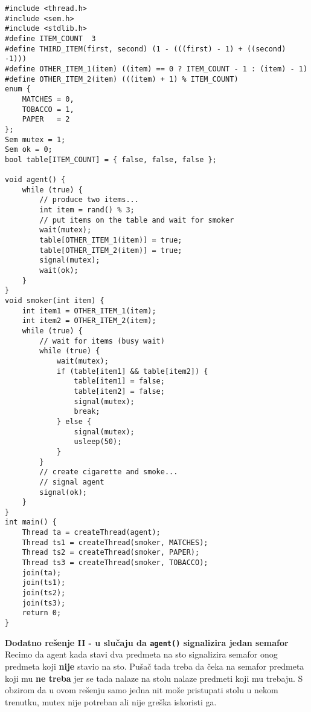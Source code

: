 \begin{lstlisting}
#include <thread.h>
#include <sem.h>
#include <stdlib.h>
#define ITEM_COUNT  3
#define THIRD_ITEM(first, second) (1 - (((first) - 1) + ((second) -1)))
#define OTHER_ITEM_1(item) ((item) == 0 ? ITEM_COUNT - 1 : (item) - 1)
#define OTHER_ITEM_2(item) (((item) + 1) % ITEM_COUNT) 
enum {
    MATCHES = 0,
    TOBACCO = 1,
    PAPER   = 2
};
Sem mutex = 1;
Sem ok = 0;
bool table[ITEM_COUNT] = { false, false, false };

void agent() {
    while (true) {
        // produce two items...
        int item = rand() % 3;
        // put items on the table and wait for smoker
        wait(mutex);
        table[OTHER_ITEM_1(item)] = true;
        table[OTHER_ITEM_2(item)] = true;
        signal(mutex);
        wait(ok);
    }
}
void smoker(int item) {
    int item1 = OTHER_ITEM_1(item);
    int item2 = OTHER_ITEM_2(item);
    while (true) {
        // wait for items (busy wait)
        while (true) {
            wait(mutex);
            if (table[item1] && table[item2]) {
                table[item1] = false;
                table[item2] = false;
                signal(mutex);
                break;
            } else {
                signal(mutex);
                usleep(50);
            }
        }
		// create cigarette and smoke...
		// signal agent
        signal(ok);
    }
}
int main() {
    Thread ta = createThread(agent);
    Thread ts1 = createThread(smoker, MATCHES);
    Thread ts2 = createThread(smoker, PAPER);
    Thread ts3 = createThread(smoker, TOBACCO);
    join(ta);
    join(ts1);
    join(ts2);
    join(ts3);
    return 0;
}

\end{lstlisting}
\clearpage
\textbf{\large Dodatno re\v{s}enje II - u slu\v{c}aju da \texttt{agent()} signalizira jedan semafor}\\
Recimo da agent kada stavi dva predmeta na sto signalizira semafor onog predmeta koji \textbf{nije} stavio na sto. Pu\v{s}a\v{c} tada treba da \v{c}eka na semafor predmeta koji mu \textbf{ne treba} jer se tada nalaze na stolu nalaze predmeti koji mu  trebaju. S obzirom da u ovom re\v{s}enju samo jedna nit mo\v{z}e pristupati stolu u nekom trenutku, mutex nije potreban ali nije gre\v{s}ka iskoristi ga.
